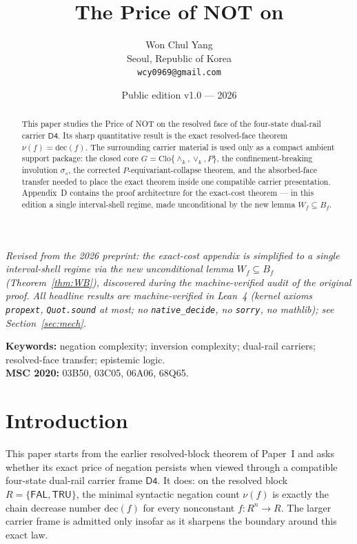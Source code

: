 \documentclass[11pt]{article}
\title{The Price of NOT on \Dfour}
\author{Won Chul Yang\\ \small Seoul, Republic of Korea \\ \small \texttt{wcy0969@gmail.com}}
\date{Public edition v1.0 --- 2026}
\theoremstyle{remark}
\newcommand{\Dfour}{\ensuremath{\mathsf{D4}}}
\newcommand{\FAL}{\ensuremath{\mathsf{FAL}}}
\newcommand{\TRU}{\ensuremath{\mathsf{TRU}}}
\newcommand{\meetk}{\ensuremath{\wedge_k}}
\newcommand{\joink}{\ensuremath{\vee_k}}
\newcommand{\Clo}{\ensuremath{\mathrm{Clo}}}
\newcommand{\dec}{\ensuremath{\mathrm{dec}}}
\begin{document}
\maketitle

\begin{center}\small\itshape
Revised from the 2026 preprint: the exact-cost appendix is simplified to a
single interval-shell regime via the new unconditional lemma $W_f \subseteq
B_f$ (Theorem~\ref{thm:WB}), discovered during the machine-verified audit of
the original proof. All headline results are machine-verified in Lean~4
(kernel axioms \texttt{propext}, \texttt{Quot.sound} at most; no
\texttt{native\_decide}, no \texttt{sorry}, no mathlib); see
Section~\ref{sec:mech}.
\end{center}

\begin{abstract}
This paper studies the Price of NOT on the resolved face of the four-state
dual-rail carrier \Dfour. Its sharp quantitative result is the exact
resolved-face theorem $\nu(f)=\dec(f)$. The surrounding carrier material is
used only as a compact ambient support package: the closed core
$G=\Clo\{\meetk,\joink,P\}$, the confinement-breaking involution $\sigma_s$,
the corrected $P$-equivariant-collapse theorem, and the absorbed-face
transfer needed to place the exact theorem inside one compatible carrier
presentation. Appendix~D contains the proof architecture for the exact-cost
theorem --- in this edition a single interval-shell regime, made
unconditional by the new lemma $W_f\subseteq B_f$.
\end{abstract}

\noindent\textbf{Keywords:} negation complexity; inversion complexity;
dual-rail carriers; resolved-face transfer; epistemic logic.\\
\textbf{MSC 2020:} 03B50, 03C05, 06A06, 68Q65.

\section{Introduction}\label{sec:intro}

This paper starts from the earlier resolved-block theorem of Paper~I
\cite{wcy1} and asks whether its exact price of negation persists when
viewed through a compatible four-state dual-rail carrier frame \Dfour. It
does: on the resolved block $R=\{\FAL,\TRU\}$, the minimal syntactic
negation count $\nu(f)$ is exactly the chain decrease number $\dec(f)$ for
every nonconstant $f:R^n\to R$. The larger carrier frame is admitted only
insofar as it sharpens the boundary around this exact law.
\end{document}
